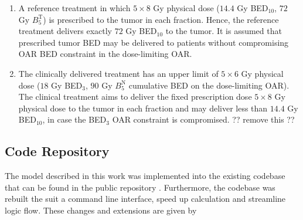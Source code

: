 \documentclass[\relativeRoot/ada.tex]{subfiles}
\begin{document}
\begin{enumerate}
    \item A reference treatment in which $5 \times 8$ Gy physical dose ($14.4$ Gy BED$_{10}$, $72$ Gy $B_5^{\text{T}}$) is prescribed to the tumor in each fraction. Hence, the reference treatment delivers exactly $72$ Gy BED$_{10}$ to the tumor. It is assumed that prescribed tumor BED may be delivered to patients without compromising OAR BED constraint in the dose-limiting OAR.

%    

    \item The clinically delivered treatment has an upper limit of $5 \times 6$ Gy physical dose ($18$ Gy BED$_{3}$, $90$ Gy $B_5^{\text{N}}$ cumulative BED on the dose-limiting OAR). The clinical treatment aims to deliver the fixed prescription dose $5 \times 8$ Gy physical dose to the tumor in each fraction and may deliver less than $14.4$ Gy BED$_{10}$, in case the BED$_{3}$ OAR constraint is compromised. ?? remove this ??
\end{enumerate}

\subsection{Code Repository}

The model described in this work was implemented into the existing codebase that can be found in the public repository \cite{adaptfx_package}. Furthermore, the codebase was rebuilt the suit a command line interface, speed up calculation and streamline logic flow. These changes and extensions are given by
\end{document}
